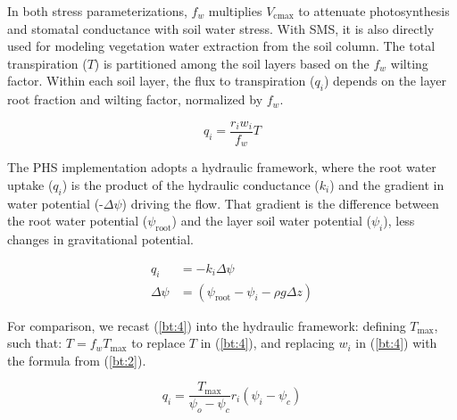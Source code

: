 \documentclass[draft,linenumbers]{agujournal}
\begin{document}
    In both stress parameterizations, $f_w$ multiplies $V_{\text{cmax}}$ to attenuate photosynthesis and stomatal conductance with soil water stress. 
    With SMS, it is also directly used for modeling vegetation water extraction from the soil column. 
    The total transpiration ($T$) is partitioned among the soil layers based on the $f_w$ wilting factor. 
    Within each soil layer, the flux to transpiration ($q_i$) depends on the layer root fraction and wilting factor, normalized by $f_w$.

    \begin{linenomath*}
    \begin{equation}
    \label{bt:4}
    q_i = \dfrac{r_i w_i}{f_w}T
    \end{equation}
    \end{linenomath*}
    
    The PHS implementation adopts a hydraulic framework, where the root water uptake ($q_i$) is 
    the product of the hydraulic conductance ($k_i$) and the gradient in water potential (-$\Delta\psi$) driving the flow.
    That gradient is the difference between the root water potential ($\psi_{\text{root}}$) and the layer soil water potential ($\psi_i$), less changes in gravitational potential.
    \begin{linenomath*}
    \begin{equation}
        \begin{aligned}
    q_i &= -k_i \Delta\psi \\
    \Delta\psi &= \left(\psi_{\text{root}}-\psi_{i}-\rho g \Delta z\right)
    \label{phs:sink}
    \end{aligned}
    \end{equation}
    \end{linenomath*}
    
    For comparison, we recast (\ref{bt:4}) into the hydraulic framework: defining $T_{\text{max}}$, such that: $T = 
    f_w T_{\text{max}}$ to replace $T$ in (\ref{bt:4}), and replacing $w_i$ in (\ref{bt:4}) with the formula from (\ref{bt:2}).
    
    \begin{linenomath*}
    \begin{equation} 
    q_i = \dfrac{T_{\text{max}}}{\psi_{o}-\psi_{c}} r_i \left(\psi_i-\psi_{c} \right)
    \end{equation}
    \end{linenomath*}
    
\end{document}
